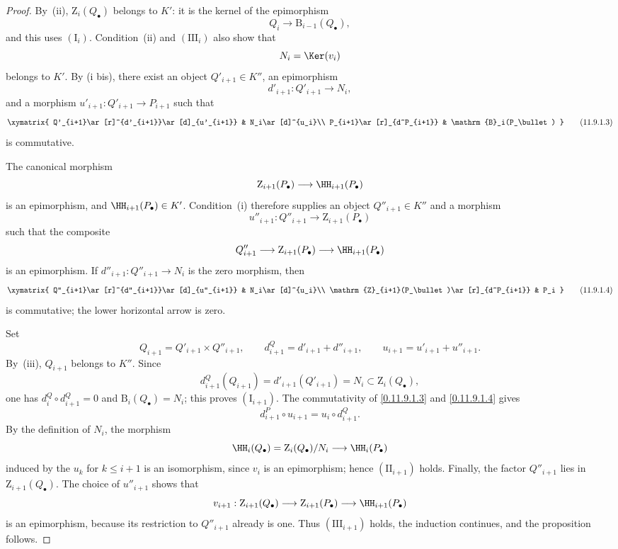 \begin{proof}
By~(ii), $\mathrm{Z}_i(Q_\bullet)$ belongs to $K'$: it is the kernel of
the epimorphism
\[
  Q_i\longrightarrow\mathrm{B}_{i-1}(Q_\bullet),
\]
and this uses $(\mathrm{I}_i)$.
Condition~(ii) and $(\mathrm{III}_i)$ also show that
\[
  N_i=\Ker(v_i)
\]
belongs to $K'$.
By (i bis), there exist an object $Q'_{i+1}\in K''$, an epimorphism
\[
  d'_{i+1}:Q'_{i+1}\longrightarrow N_i,
\]
and a morphism $u'_{i+1}:Q'_{i+1}\to P_{i+1}$ such that
\[
  \xymatrix{
    Q'_{i+1}\ar[r]^{d'_{i+1}}\ar[d]_{u'_{i+1}} &
    N_i\ar[d]^{u_i}\\
    P_{i+1}\ar[r]_{d^P_{i+1}} &
    \mathrm{B}_i(P_\bullet)
  }
  \tag{11.9.1.3}\label{0.11.9.1.3}
\]
is commutative.

The canonical morphism
\[
  \mathrm{Z}_{i+1}(P_\bullet)
  \longrightarrow
  \HH_{i+1}(P_\bullet)
\]
is an epimorphism, and $\HH_{i+1}(P_\bullet)\in K'$.
Condition~(i) therefore supplies an object $Q''_{i+1}\in K''$ and a
morphism
\[
  u''_{i+1}:Q''_{i+1}\longrightarrow
  \mathrm{Z}_{i+1}(P_\bullet)
\]
such that the composite
\[
  Q''_{i+1}
  \longrightarrow
  \mathrm{Z}_{i+1}(P_\bullet)
  \longrightarrow
  \HH_{i+1}(P_\bullet)
\]
is an epimorphism.
If $d''_{i+1}:Q''_{i+1}\to N_i$ is the zero morphism, then
\[
  \xymatrix{
    Q''_{i+1}\ar[r]^{d''_{i+1}}\ar[d]_{u''_{i+1}} &
    N_i\ar[d]^{u_i}\\
    \mathrm{Z}_{i+1}(P_\bullet)\ar[r]_{d^P_{i+1}} &
    P_i
  }
  \tag{11.9.1.4}\label{0.11.9.1.4}
\]
is commutative; the lower horizontal arrow is zero.

Set
\[
  Q_{i+1}=Q'_{i+1}\times Q''_{i+1},
  \qquad
  d^Q_{i+1}=d'_{i+1}+d''_{i+1},
  \qquad
  u_{i+1}=u'_{i+1}+u''_{i+1}.
\]
By~(iii), $Q_{i+1}$ belongs to $K''$.
Since
\[
  d^Q_{i+1}(Q_{i+1})
  =
  d'_{i+1}(Q'_{i+1})
  =
  N_i
  \subset
  \mathrm{Z}_i(Q_\bullet),
\]
one has
$d^Q_i\circ d^Q_{i+1}=0$ and
$\mathrm{B}_i(Q_\bullet)=N_i$; this proves
$(\mathrm{I}_{i+1})$.
The commutativity of \eqref{0.11.9.1.3} and
\eqref{0.11.9.1.4} gives
\[
  d^P_{i+1}\circ u_{i+1}
  =
  u_i\circ d^Q_{i+1}.
\]
By the definition of $N_i$, the morphism
\[
  \HH_i(Q_\bullet)
  =
  \mathrm{Z}_i(Q_\bullet)/N_i
  \longrightarrow
  \HH_i(P_\bullet)
\]
induced by the $u_k$ for $k\leq i+1$ is an isomorphism, since $v_i$ is
an epimorphism; hence $(\mathrm{II}_{i+1})$ holds.
Finally, the factor $Q''_{i+1}$ lies in
$\mathrm{Z}_{i+1}(Q_\bullet)$.
The choice of $u''_{i+1}$ shows that
\[
  v_{i+1}:
  \mathrm{Z}_{i+1}(Q_\bullet)
  \longrightarrow
  \mathrm{Z}_{i+1}(P_\bullet)
  \longrightarrow
  \HH_{i+1}(P_\bullet)
\]
is an epimorphism, because its restriction to $Q''_{i+1}$ already is
one.
Thus $(\mathrm{III}_{i+1})$ holds, the induction continues, and the
proposition follows.
\end{proof}

